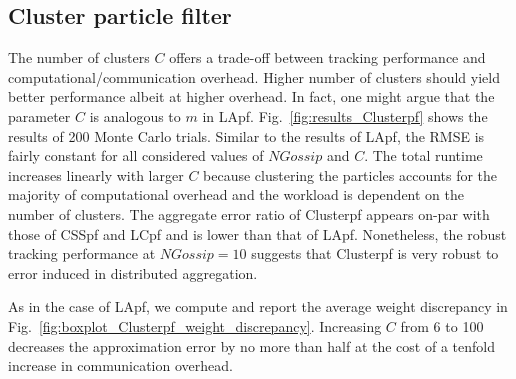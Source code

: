 \documentclass[10pt,letterpaper,final]{article}
\begin{document}
\subsection{Cluster particle filter}
The number of clusters $C$ offers a trade-off between tracking performance and computational/communication overhead. Higher number of clusters should yield better performance albeit at higher overhead. In fact, one might argue that the parameter $C$ is analogous to $m$ in LApf. Fig.~\ref{fig:results_Clusterpf} shows the results of 200 Monte Carlo trials. Similar to the results of LApf, the RMSE is fairly constant for all considered values of $NGossip$ and $C$. The total runtime increases linearly with larger $C$ because clustering the particles accounts for the majority of computational overhead and the workload is dependent on the number of clusters. The aggregate error ratio of Clusterpf appears on-par with those of CSSpf and LCpf and is lower than that of LApf. Nonetheless, the robust tracking performance at $NGossip=10$ suggests that Clusterpf is very robust to error induced in distributed aggregation. 

As in the case of LApf, we compute and report the average weight discrepancy in Fig.~\ref{fig:boxplot_Clusterpf_weight_discrepancy}. Increasing $C$ from 6 to 100 decreases the approximation error by no more than half at the cost of a tenfold increase in communication overhead. 
\end{document}
